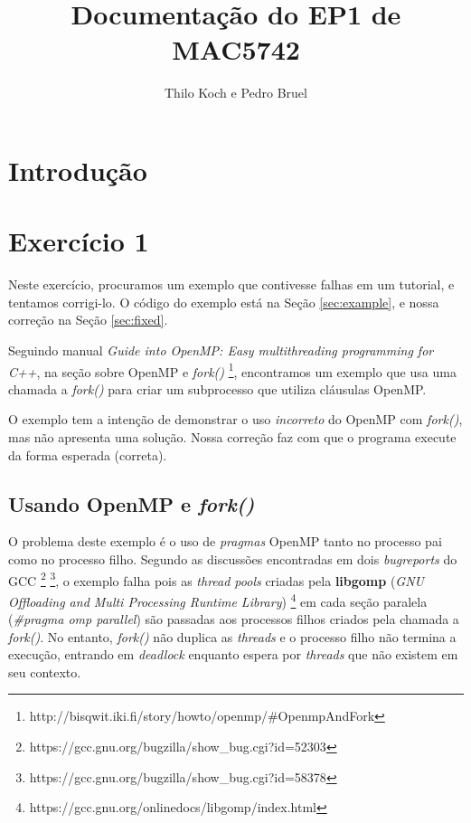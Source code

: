 \documentclass[a4paper, 12pt]{article}
\begin{document}
\hypersetup{backref,pdfpagemode=FullScreen,colorlinks=true}

\title{Documentação do EP1 de MAC5742}
\author{Thilo Koch e Pedro Bruel}
\date{}
\maketitle

\section{Introdução} \label{sec:intro}

\section{Exercício 1}

Neste exercício, procuramos um exemplo que contivesse falhas em um
tutorial, e tentamos corrigi-lo. O código do exemplo está na Seção
\ref{sec:example}, e nossa correção na Seção \ref{sec:fixed}.

Seguindo manual \textit{Guide into OpenMP: Easy multithreading
programming for C++}, na seção sobre OpenMP e \textit{fork()}
\footnote{http://bisqwit.iki.fi/story/howto/openmp/\#OpenmpAndFork},
encontramos um exemplo que usa uma chamada a \textit{fork()} para criar um
subprocesso que utiliza cláusulas OpenMP.

O exemplo tem a intenção de demonstrar o uso \textit{incorreto} do OpenMP
com \textit{fork()}, mas não apresenta uma solução.
Nossa correção faz com que o programa execute da forma esperada (correta).

\subsection{Usando OpenMP e \textit{fork()}}

O problema deste exemplo é o uso de \textit{pragmas} OpenMP tanto
no processo pai como no processo filho. Segundo as discussões
encontradas em dois \textit{bugreports} do GCC
\footnote{https://gcc.gnu.org/bugzilla/show\_bug.cgi?id=52303}
\footnote{https://gcc.gnu.org/bugzilla/show\_bug.cgi?id=58378},
o exemplo falha pois as \textit{thread pools} criadas pela \textbf{libgomp}
(\textit{GNU Offloading and Multi Processing Runtime Library})
\footnote{https://gcc.gnu.org/onlinedocs/libgomp/index.html} em cada
seção paralela (\textit{\#pragma omp parallel}) são passadas aos processos
filhos criados pela chamada a \textit{fork()}. No entanto, \textit{fork()}
não duplica as \textit{threads} e o processo filho não termina a execução,
entrando em \textit{deadlock} enquanto espera por \textit{threads} que não
existem em seu contexto.
\end{document}
